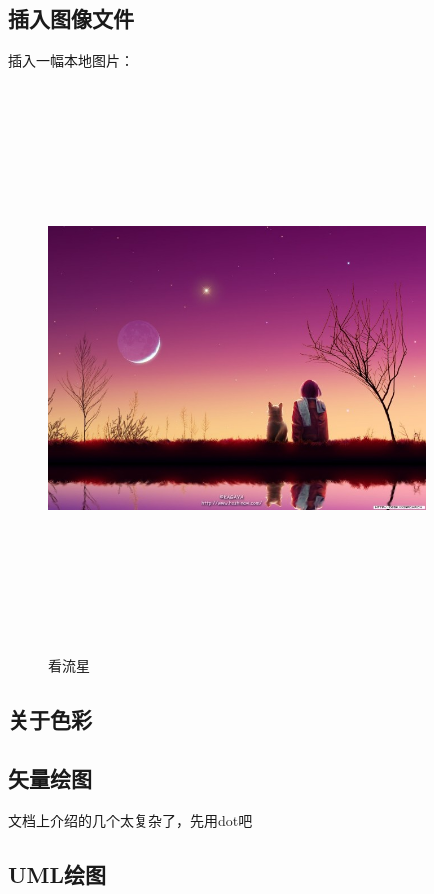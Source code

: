 \documentclass[a4paper,12pt]{article} %
\begin{document}
\subsection{插入图像文件}
插入一幅本地图片：\\
\begin{figure}[htbp] %
  \centering
  \includegraphics[width=10cm,height=15cm,keepaspectratio]{pic1.jpg}
  \caption{看流星}
  \label{fig:star1}
\end{figure}

\subsection{关于色彩} %

\subsection{矢量绘图}
文档上介绍的几个太复杂了，先用dot吧\\
\subsection{UML绘图}
\end{document}
